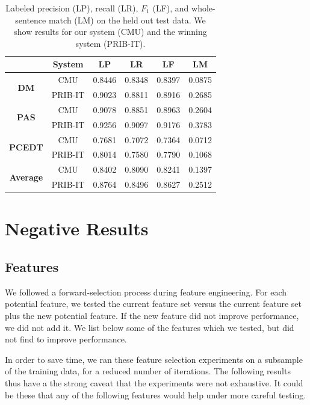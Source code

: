 \documentclass[11pt]{article}
\begin{document}
\begin{table}
\begin{center}
\begin{tabular*}{\textwidth}%
{@{\extracolsep{\fill}}cc|cccc}%
 & System & LP & LR & LF & LM \\
\hline
\hline
\multirow{2}{*}{\textbf{DM}}
& CMU & 0.8446 & 0.8348 & 0.8397 & 0.0875 \\
& PRIB-IT & 0.9023 & 0.8811 & 0.8916 & 0.2685 \\
\hline
\multirow{2}{*}{\textbf{PAS}}
& CMU & 0.9078 & 0.8851 & 0.8963 & 0.2604 \\
& PRIB-IT & 0.9256 & 0.9097 & 0.9176 & 0.3783 \\
\hline
\multirow{2}{*}{\textbf{PCEDT}}
& CMU & 0.7681 & 0.7072 & 0.7364 & 0.0712 \\
& PRIB-IT & 0.8014 & 0.7580 & 0.7790 & 0.1068 \\
\hline
\hline
\multirow{2}{*}{\textbf{Average}}
& CMU & 0.8402 & 0.8090 & 0.8241 & 0.1397 \\
& PRIB-IT & 0.8764 & 0.8496 & 0.8627 & 0.2512 \\
\end{tabular*}
\caption{Labeled precision (LP), recall (LR), $F_1$ (LF), and
whole-sentence match (LM) on the held out test data.
We show results for our system (CMU) and the winning system (PRIB-IT).
}
\label{table:perf}
\end{center}
\end{table}



\section{Negative Results}

\subsection{Features}
\label{s:badfeatures}

We followed a forward-selection process during feature engineering.
For each potential feature, we tested the current feature set versus the current
feature set plus the new potential feature.
If the new feature did not improve performance, we did not add it.
We list below some of the features which we tested, but did not find to improve
performance.

In order to save time, we ran these feature selection experiments
on a subsample of the training data, for a reduced number of iterations.
The following results thus have a 
the strong caveat that the experiments were
not exhaustive.  It could be these that any of the following features would help under more careful testing.
\end{document}
